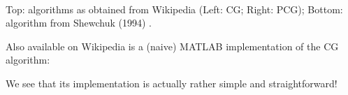 \begin{itemize}
\begin{center}
\\
{\captionfont Top: algorithms as obtained from Wikipedia (Left: CG; Right: PCG);
Bottom: algorithm from Shewchuk (1994) \cite{shew94}.}
\end{center}

Also available on Wikipedia is a (naive) MATLAB implementation of the CG algorithm:
\begin{center}
\end{center}
We see that its implementation is actually rather simple and straightforward!


\end{itemize}
